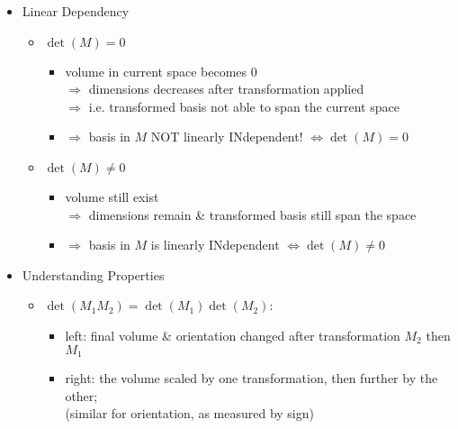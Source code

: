 \begin{itemize}
\item Linear Dependency
	\begin{itemize}
	\item $\det(M) = 0$
		\begin{itemize}
		\item volume in current space becomes 0 \\
		$\Rightarrow$ dimensions decreases after transformation applied \\
		$\Rightarrow$ i.e. transformed basis not able to span the current space
		\item $\Rightarrow$ basis in $M$ NOT linearly INdependent! $\Leftrightarrow \det(M)=0$
		\end{itemize}
	\item $\det(M) \neq 0$
		\begin{itemize}
		\item volume still exist \\
		$\Rightarrow$ dimensions remain \& transformed basis still span the space
		\item $\Rightarrow$ basis in $M$ is linearly INdependent $\Leftrightarrow \det(M) \neq 0$
		\end{itemize}
	\end{itemize}

\item Understanding Properties
	\begin{itemize}
	\item $\det(M_1M_2) = \det(M_1)\det(M_2)$:
		\begin{itemize}
		\item left: final volume \& orientation changed after transformation $M_2$ then $M_1$
		\item right: the volume scaled by one transformation, then further by the other; \\ 
		(similar for orientation, as measured by sign)
		\end{itemize}
	\end{itemize}
\end{itemize}

